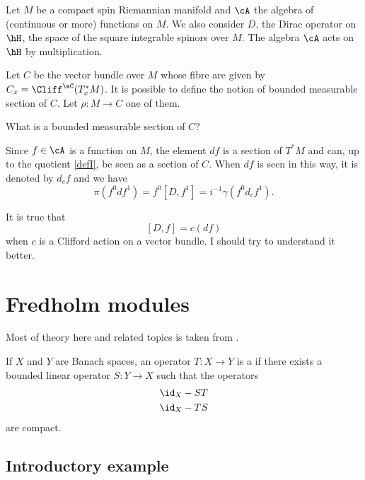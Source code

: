 Let $M$ be a compact spin Riemannian manifold and $\cA$ the algebra of (continuous or more) functions on $M$. We also consider $D$, the Dirac operator on $\hH$, the space of the square integrable spinors over $M$. The algebra $\cA$ acts on $\hH$ by multiplication.

Let $C$ be the vector bundle over $M$ whose fibre are given by $C_x=\Cliff^{\eC}(T^*_xM)$. It is possible to define the notion of bounded measurable section of $C$. Let $\rho\colon M\to C$ one of them.

\begin{probleme}
	What is a bounded measurable section of $C$?
\end{probleme}

Since $f\in\cA$ is a function on $M$, the element $df$ is a section of $T^*M$ and can, up to the quotient \eqref{defI}, be seen as a section of $C$. When $df$ is seen in this way, it is denoted by $d_cf$ and we have
\[
  \pi(f^0df^1)=f^0[D,f^1]=i^{-1}\gamma(f^0d_cf^1).
\]

\begin{probleme}
It is true that
\[
  [D,f]=c(df)
\]
when $c$ is a Clifford action on a vector bundle. I should try to understand it better.
\end{probleme}


\section{Fredholm modules}

Most of theory here and related topics is taken from \cite{ConnesNCG,Landi}.

If $X$ and $Y$ are Banach spaces, an operator $T\colon X\to Y$ is a  if there exists a bounded linear operator $S\colon Y\to X$ such that the operators
\begin{subequations}
	\begin{align}
		\id_X-ST\\
		\id_X-TS
	\end{align}
\end{subequations}
are compact.

\subsection{Introductory example}

